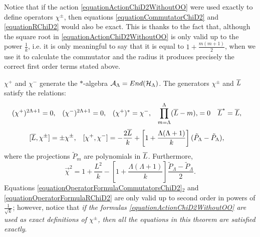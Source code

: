\begin{remark}
Notice that if the action \eqref{equationActionChiD2WithoutOO} were used exactly to define operators $\chi^\pm$, then equations \eqref{equationCommutatorChiD2} and \eqref{equationRChiD2} would also be exact. This is thanks to the fact that, although the square root in \eqref{equationActionChiD2WithoutOO} is only valid up to the power $\frac{1}{k}$, i.e. it is only meaningful to say that it is equal to $ 1+\frac{m(m+1)}{2}$, when we use it to calculate the commutator and the radius it produces precisely the correct first order terms stated above.
\end{remark}

\begin{theorem}[Summary]
$\chi^+$ and $\chi^-$ generate the $*$-algebra $\mathcal A_\Lambda = End(\mathcal H_\Lambda)$. The generators $\chi^\pm$ and $\overline{L}$ satisfy  the relations:
\begin{align}\label{equationOperatorFormulaRelationsChiD2}
    (\chi^+)^{2\Lambda+1} &= 0, & 
    (\chi^-)^{2\Lambda+1} &= 0, & 
    (\chi^+)^*&= \chi^-, & 
    \prod_{m = \Lambda}^\Lambda (\overline{L} - m), &= 0 & 
    \overline{L}^* &= \overline{L},
\end{align}
\begin{align}\label{equationOperatorFormulaCommutatorsChiD2}
    [\overline{L}, \chi^\pm] &= \pm \chi^\pm,&
    [\chi^+, \chi^-] &= - \frac{2\overline{L}}{k} + \left[ 1 + \frac{\Lambda(\Lambda+1)}{k}\right](\tilde P_\Lambda - \tilde P_\Lambda),
\end{align}
where the projections $\tilde P_m$ are polynomials in $\overline{L}$. Furthermore,
\begin{equation}\label{equationOperatorFormulaRChiD2}
    \vec \chi^2 = 1 + \frac{L^2}{k} - \left[ 1 + \frac{\Lambda(\Lambda+1)}{k}\right]\frac{\tilde P_\Lambda - \tilde P_\Lambda}{2}.
\end{equation}
Equations \eqref{equationOperatorFormulaCommutatorsChiD2}$_2$ and \eqref{equationOperatorFormulaRChiD2} are only valid up to second order in powers of $\frac{1}{\sqrt{k}}$; however, notice that \emph{if the formulas \eqref{equationActionChiD2WithoutOO} are used as exact definitions of $\chi^\pm$, then all the equations in this theorem are satisfied exactly}.
\end{theorem}








